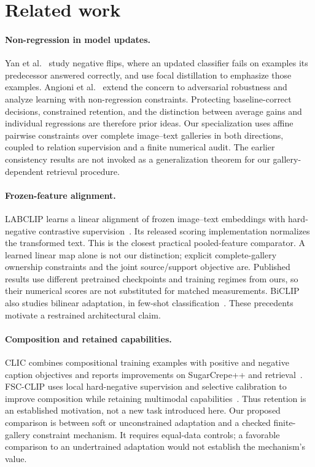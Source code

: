 \documentclass[11pt]{article}
\begin{document}
\section{Related work}
\paragraph{Non-regression in model updates.}
Yan et al.~\cite{pct} study negative flips, where an updated classifier
fails on examples its predecessor answered correctly, and use focal
distillation to emphasize those examples. Angioni et al.~\cite{rcat}
extend the concern to adversarial robustness and analyze learning with
non-regression constraints. Protecting baseline-correct decisions,
constrained retention, and the distinction between average gains and
individual regressions are therefore prior ideas. Our specialization
uses affine pairwise constraints over complete image--text galleries in
both directions, coupled to relation supervision and a finite numerical
audit. The earlier consistency results are not invoked as a generalization
theorem for our gallery-dependent retrieval procedure.

\paragraph{Frozen-feature alignment.}
LABCLIP learns a linear alignment of frozen image--text embeddings with
hard-negative contrastive supervision~\cite{labclip}. Its released scoring
implementation normalizes the transformed text. This is the closest
practical pooled-feature comparator. A learned linear map alone is not our
distinction; explicit complete-gallery ownership constraints and the joint
source/support objective are. Published results use different pretrained
checkpoints and training regimes from ours, so their numerical scores are
not substituted for matched measurements. BiCLIP also studies bilinear
adaptation, in few-shot classification~\cite{biclip}. These precedents
motivate a restrained architectural claim.

\paragraph{Composition and retained capabilities.}
CLIC combines compositional training examples with positive and negative
caption objectives and reports improvements on SugarCrepe++ and
retrieval~\cite{clic}. FSC-CLIP uses local hard-negative supervision and
selective calibration to improve composition while retaining multimodal
capabilities~\cite{fsc}. Thus retention is an established motivation,
not a new task introduced here. Our proposed comparison is between soft
or unconstrained adaptation and a checked finite-gallery constraint
mechanism. It requires equal-data controls; a favorable comparison to an
undertrained adaptation would not establish the mechanism's value.
\end{document}

